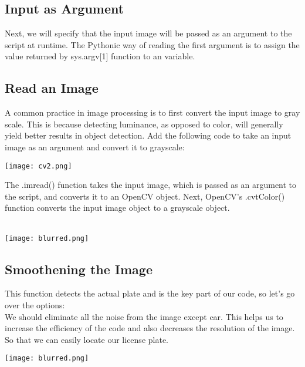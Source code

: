 \documentclass[12pt,a4paper]{report}
\begin{document}
\subsection{Input as Argument}
Next, we will specify that the input image will be passed as an argument to the script at runtime. The Pythonic way of reading the first argument is to assign the value returned by sys.argv[1] function to an variable.\\

\subsection{Read an Image}
A common practice in image processing is to first convert the input image to gray scale. This is because detecting luminance, as opposed to color, will generally yield better results in object detection. Add the following code to take an input image as an argument and convert it to grayscale:
\begin{center}
\texttt{[image: cv2.png]}

\begin{figure}[h!]
\caption{}
\end{figure}
\end{center}
The .imread() function takes the input image, which is passed as an argument to the script, and converts it to an OpenCV object. Next, OpenCV’s .cvtColor() function converts the input image object to a grayscale object.\\\\
\begin{center}
\texttt{[image: blurred.png]}
\begin{figure}[h!]
\caption{}
\end{figure}
\end{center}


\subsection{Smoothening the Image}
This function detects the actual plate and is the key part of our code, so let’s go over the options:\\
We should eliminate all the noise from the image except car. This helps us to increase the efficiency of the code and also decreases the resolution of the image. So that we can easily locate our license plate.
\begin{center}
\texttt{[image: blurred.png]}

\begin{figure}[h!]
\caption{}
\end{figure}
\end{center}
\end{document}
